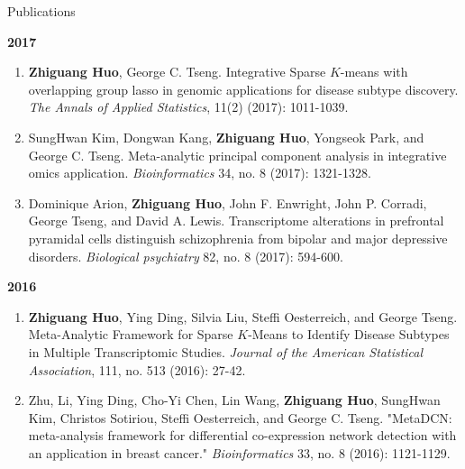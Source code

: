 \documentclass{resume} %
\begin{document}
\begin{rSection}{Publications}
\begin{enumerate}[noitemsep,topsep=0pt, resume]
\end{enumerate}

\textbf{2017}
\begin{enumerate}[noitemsep,topsep=0pt, resume]

\item {\bf Zhiguang Huo}, George C. Tseng. 
    Integrative Sparse $K$-means with overlapping group lasso in genomic applications for disease subtype discovery.
    \emph{The Annals of Applied Statistics}, 11(2) (2017): 1011-1039.

\item 
SungHwan Kim, Dongwan Kang, {\bf Zhiguang Huo}, Yongseok Park, and George C. Tseng. 
Meta-analytic principal component analysis in integrative omics application. 
\emph{Bioinformatics} 34, no. 8 (2017): 1321-1328.


\item  
Dominique Arion, {\bf Zhiguang Huo}, John F. Enwright, John P. Corradi, George Tseng, and David A. Lewis. Transcriptome alterations in prefrontal pyramidal cells distinguish schizophrenia from bipolar and major depressive disorders. \emph{Biological psychiatry} 82, no. 8 (2017): 594-600.





\end{enumerate}

\textbf{2016}
\begin{enumerate}[noitemsep,topsep=0pt,resume]

 \item  {\bf Zhiguang Huo}, Ying Ding, Silvia Liu, Steffi Oesterreich, and George Tseng. Meta-Analytic Framework for Sparse $K$-Means to Identify Disease Subtypes in Multiple Transcriptomic Studies. \emph{Journal of the American Statistical Association},  111, no. 513 (2016): 27-42.

\item 
Zhu, Li, Ying Ding, Cho-Yi Chen, Lin Wang,  {\bf Zhiguang Huo}, SungHwan Kim, Christos Sotiriou, Steffi Oesterreich, and George C. Tseng. "MetaDCN: meta-analysis framework for differential co-expression network detection with an application in breast cancer." \emph{Bioinformatics} 33, no. 8 (2016): 1121-1129.




\end{enumerate}



\end{rSection}
\end{document}
